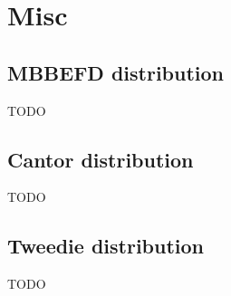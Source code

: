 % 	
%
%
%

\chapter{Misc}
\section{MBBEFD distribution}
TODO
\section{Cantor distribution}
TODO
\section{Tweedie distribution}
TODO